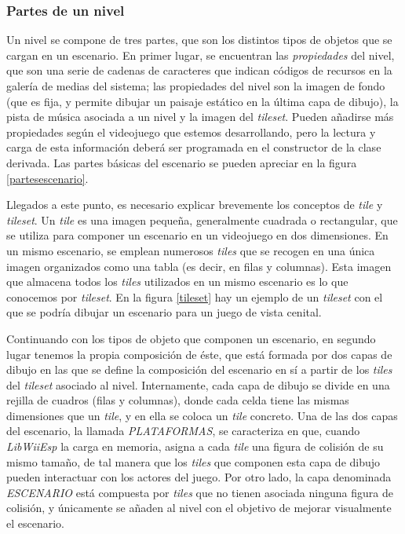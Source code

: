 \subsubsection{Partes de un nivel}

Un nivel se compone de tres partes, que son los distintos tipos de objetos que se cargan en un escenario. En primer lugar, se encuentran las \emph{propiedades} del nivel, que son una serie de cadenas de caracteres que indican códigos de recursos en la galería de medias del sistema; las propiedades del nivel son la imagen de fondo (que es fija, y permite dibujar un paisaje estático en la última capa de dibujo), la pista de música asociada a un nivel y la imagen del \emph{tileset}. Pueden añadirse más propiedades según el videojuego que estemos desarrollando, pero la lectura y carga de esta información deberá ser programada en el constructor de la clase derivada. Las partes básicas del escenario se pueden apreciar en la figura \ref{partesescenario}.\\


Llegados a este punto, es necesario explicar brevemente los conceptos de \emph{tile} y \emph{tileset}. Un \emph{tile} es una imagen pequeña, generalmente cuadrada o rectangular, que se utiliza para componer un escenario en un videojuego en dos dimensiones. En un mismo escenario, se emplean numerosos \emph{tiles} que se recogen en una única imagen organizados como una tabla (es decir, en filas y columnas). Esta imagen que almacena todos los \emph{tiles} utilizados en un mismo escenario es lo que conocemos por \emph{tileset}. En la figura \ref{tileset} hay un ejemplo de un \emph{tileset} con el que se podría dibujar un escenario para un juego de vista cenital.\\


Continuando con los tipos de objeto que componen un escenario, en segundo lugar tenemos la propia composición de éste, que está formada por dos capas de dibujo en las que se define la composición del escenario en sí a partir de los \emph{tiles} del \emph{tileset} asociado al nivel. Internamente, cada capa de dibujo se divide en una rejilla de cuadros (filas y columnas), donde cada celda tiene las mismas dimensiones que un \emph{tile}, y en ella se coloca un \emph{tile} concreto. Una de las dos capas del escenario, la llamada \emph{PLATAFORMAS}, se caracteriza en que, cuando \emph{LibWiiEsp} la carga en memoria, asigna a cada \emph{tile} una figura de colisión de su mismo tamaño, de tal manera que los \emph{tiles} que componen esta capa de dibujo pueden interactuar con los actores del juego. Por otro lado, la capa denominada \emph{ESCENARIO} está compuesta por \emph{tiles} que no tienen asociada ninguna figura de colisión, y únicamente se añaden al nivel con el objetivo de mejorar visualmente el escenario.\\

